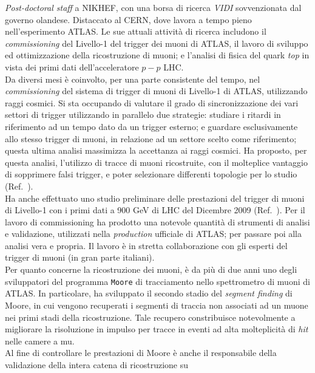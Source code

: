 \documentclass{article}
\begin{document}
\begin{vita}
{\it Post-doctoral staff} a NIKHEF, con una borsa di ricerca
{\it VIDI} sovvenzionata dal governo olandese. Distaccato al CERN, dove lavora a tempo pieno nell'esperimento ATLAS. Le sue attuali
attivit\`{a} di ricerca includono il {\it commissioning} del Livello-1 del trigger dei muoni di ATLAS, il lavoro di sviluppo ed ottimizzazione
della ricostruzione di muoni; e l'analisi di fisica del quark {\it top}
in vista dei primi dati dell'acceleratore $p-p$ LHC. \\
Da diversi mesi \`e coinvolto, per una parte consistente del tempo, 
nel {\it commissioning} del sistema di trigger di muoni di Livello-1 di ATLAS, utilizzando
raggi cosmici. Si sta occupando di valutare il grado
di sincronizzazione dei vari settori di trigger utilizzando in parallelo due strategie: studiare i ritardi in
riferimento ad un tempo dato da un trigger esterno; e guardare esclusivamente allo stesso trigger di muoni, in relazione 
ad un settore scelto come riferimento; questa ultima analisi massimizza la accettanza ai raggi cosmici.  
Ha proposto, per questa analisi, l'utilizzo di tracce di muoni ricostruite, con il molteplice vantaggio di 
sopprimere falsi trigger, e poter selezionare differenti topologie per lo studio (Ref.~). \\
Ha anche effettuato uno studio preliminare delle prestazioni del trigger di muoni di Livello-1 con i primi dati a 900 GeV 
di LHC del Dicembre 2009 (Ref.~).
Per il lavoro di commissioning ha prodotto una notevole quantit\`{a} di strumenti di analisi
 e validazione, utilizzati nella {\it production} ufficiale di ATLAS; 
per passare poi alla analisi vera e propria. 
 Il lavoro \`e in stretta collaborazione con gli
esperti del trigger di muoni (in gran parte italiani).  \\
\newline
Per quanto concerne la ricostruzione dei muoni, \`e da pi\`u di due
anni uno degli sviluppatori del programma {\tt Moore} di tracciamento nello
spettrometro di muoni di ATLAS. In particolare, ha sviluppato il
secondo stadio del {\it segment finding} di Moore, in cui vengono
recuperati i segmenti di traccia non
associati ad un muone nei primi stadi della ricostruzione. Tale
recupero constribuisce notevolmente a migliorare la risoluzione in
impulso per tracce in eventi ad alta molteplicit\`a di {\it hit} nelle
camere a mu. \\ 
Al fine di controllare le prestazioni di Moore \`e anche il
responsabile della validazione della intera catena di ricostruzione su

\end{vita}
\end{document}
